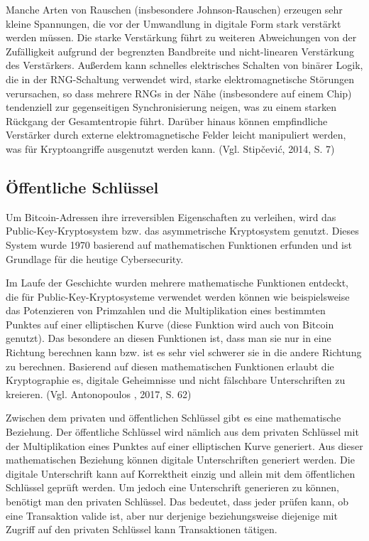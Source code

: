 Manche Arten von Rauschen (insbesondere Johnson-Rauschen) erzeugen sehr kleine Spannungen, die vor der Umwandlung in digitale Form stark verstärkt
werden müssen. Die starke Verstärkung führt zu weiteren Abweichungen von der Zufälligkeit aufgrund der begrenzten Bandbreite und nicht-linearen 
Verstärkung des Verstärkers. Außerdem kann schnelles elektrisches Schalten von binärer Logik, die in der RNG-Schaltung verwendet wird, starke 
elektromagnetische Störungen verursachen, so dass mehrere RNGs in der Nähe (insbesondere auf einem Chip) tendenziell zur gegenseitigen 
Synchronisierung neigen, was zu einem starken Rückgang der Gesamtentropie führt. Darüber hinaus können empfindliche Verstärker durch externe 
elektromagnetische Felder leicht manipuliert werden, was für Kryptoangriffe ausgenutzt werden kann. (Vgl. Stipčević, 2014, S. 7)


\subsection{Öffentliche Schlüssel}
Um Bitcoin-Adressen ihre irreversiblen Eigenschaften zu verleihen, wird das Public-Key-Kryptosystem bzw. das asymmetrische
Kryptosystem genutzt. Dieses System wurde 1970 basierend auf mathematischen Funktionen erfunden und ist Grundlage für die heutige
Cybersecurity.

Im Laufe der Geschichte wurden mehrere mathematische Funktionen entdeckt, die für Public-Key-Kryptosysteme verwendet werden können
wie beispielsweise das Potenzieren von Primzahlen und die Multiplikation eines bestimmten Punktes auf einer elliptischen Kurve
(diese Funktion wird auch von Bitcoin genutzt). Das besondere an diesen Funktionen ist, dass man sie nur in eine Richtung
berechnen kann bzw. ist es sehr viel schwerer sie in die andere Richtung zu berechnen. Basierend auf diesen mathematischen
Funktionen erlaubt die Kryptographie es, digitale Geheimnisse und nicht fälschbare Unterschriften zu kreieren. (Vgl. Antonopoulos
, 2017, S. 62)

Zwischen dem privaten und öffentlichen Schlüssel gibt es eine mathematische Beziehung. Der öffentliche Schlüssel wird nämlich
aus dem privaten Schlüssel mit der Multiplikation eines Punktes auf einer elliptischen Kurve generiert. Aus dieser mathematischen
Beziehung können digitale Unterschriften generiert werden. Die digitale Unterschrift kann auf Korrektheit einzig und allein mit
dem öffentlichen Schlüssel geprüft werden. Um jedoch eine Unterschrift generieren zu können, benötigt man den privaten Schlüssel.
Das bedeutet, dass jeder prüfen kann, ob eine Transaktion valide ist, aber nur derjenige beziehungsweise diejenige mit Zugriff auf den 
privaten Schlüssel kann Transaktionen tätigen.

